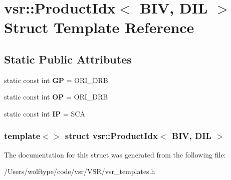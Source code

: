 \hypertarget{structvsr_1_1_product_idx_3_01_b_i_v_00_01_d_i_l_01_4}{\section{vsr\-:\-:Product\-Idx$<$ B\-I\-V, D\-I\-L $>$ Struct Template Reference}
\label{structvsr_1_1_product_idx_3_01_b_i_v_00_01_d_i_l_01_4}
}
\subsection*{Static Public Attributes}
\begin{DoxyCompactItemize}
\item 
\hypertarget{structvsr_1_1_product_idx_3_01_b_i_v_00_01_d_i_l_01_4_a290eb6f079075ffeaa738b659224dbfd}{static const int {\bfseries G\-P} = O\-R\-I\-\_\-\-D\-R\-B}\label{structvsr_1_1_product_idx_3_01_b_i_v_00_01_d_i_l_01_4_a290eb6f079075ffeaa738b659224dbfd}

\item 
\hypertarget{structvsr_1_1_product_idx_3_01_b_i_v_00_01_d_i_l_01_4_a70edb10088dc5b2c1d4dde0a2abc143f}{static const int {\bfseries O\-P} = O\-R\-I\-\_\-\-D\-R\-B}\label{structvsr_1_1_product_idx_3_01_b_i_v_00_01_d_i_l_01_4_a70edb10088dc5b2c1d4dde0a2abc143f}

\item 
\hypertarget{structvsr_1_1_product_idx_3_01_b_i_v_00_01_d_i_l_01_4_a9fb261fe8f09eb8cc755541b3f08e499}{static const int {\bfseries I\-P} = S\-C\-A}\label{structvsr_1_1_product_idx_3_01_b_i_v_00_01_d_i_l_01_4_a9fb261fe8f09eb8cc755541b3f08e499}

\end{DoxyCompactItemize}
\subsubsection*{template$<$$>$ struct vsr\-::\-Product\-Idx$<$ B\-I\-V, D\-I\-L $>$}



The documentation for this struct was generated from the following file\-:\begin{DoxyCompactItemize}
\item 
/\-Users/wolftype/code/vsr/\-V\-S\-R/vsr\-\_\-templates.\-h\end{DoxyCompactItemize}
